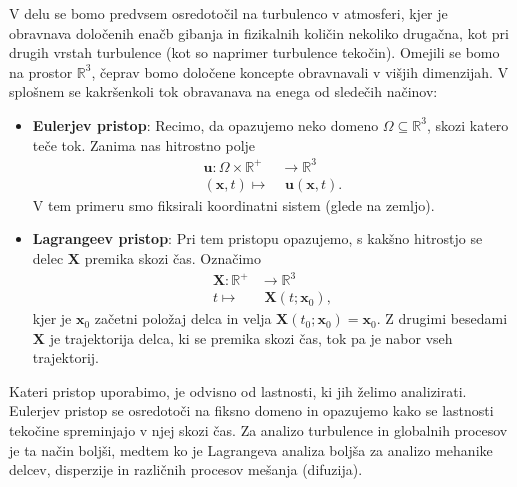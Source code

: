 \documentclass[mat2, tisk]{fmfdelo}
\newcommand{\R}{\mathbb R}
\newcommand{\bd}{\textbf}
\begin{document}
V delu se bomo predvsem osredotočil na turbulenco v atmosferi, kjer je obravnava določenih enačb
gibanja in fizikalnih količin nekoliko drugačna, kot pri drugih vrstah turbulence (kot so naprimer turbulence tekočin).
Omejili se bomo na prostor $\R^3$, čeprav bomo določene koncepte 
obravnavali v višjih dimenzijah.
V splošnem se kakršenkoli tok obravanava na enega od sledečih načinov:
\begin{itemize}
  \item \textbf{Eulerjev pristop}: Recimo, da opazujemo neko domeno $\Omega \subseteq \R^3$, skozi katero teče tok.
  Zanima nas hitrostno polje 
  \begin{align*}
  \textbf{u}: \Omega \times \R^+ &\rightarrow \R^3 \\
  (\bd{x},t) \mapsto&\,\, \textbf{u}(\bd{x},t).
  \end{align*}
  V tem primeru smo fiksirali koordinatni
  sistem (glede na zemljo).
  \item \textbf{Lagrangeev pristop}: Pri tem pristopu opazujemo, s kakšno hitrostjo se delec 
  $\bd{X}$ premika skozi čas. Označimo 
  \begin{align*}
    \bd{X}: \R^+& \rightarrow \R^3 \\
    t \mapsto&\,\, \bd{X}(t; \bd{x}_0),
  \end{align*}
  kjer je $\bd{x}_0$ začetni položaj delca in 
  velja $\bd{X}(t_0; \bd{x}_0) = \bd{x}_0$.  
  Z drugimi besedami $\bd{X}$ je trajektorija delca, ki se premika skozi čas, tok pa je nabor vseh trajektorij.
\end{itemize}

Kateri pristop uporabimo, je odvisno od lastnosti, ki jih želimo analizirati. Eulerjev pristop
se osredotoči na fiksno domeno in opazujemo kako se lastnosti tekočine spreminjajo v njej skozi čas. 
Za analizo turbulence in globalnih procesov je ta način boljši, medtem ko je Lagrangeva analiza 
boljša za analizo mehanike delcev, disperzije in različnih procesov mešanja (difuzija). 
\end{document}
